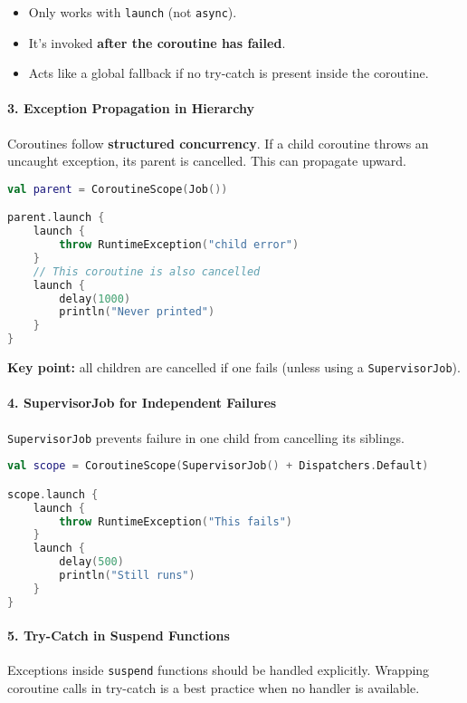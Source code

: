 \documentclass[a4paper,12pt]{article}
\begin{document}
\begin{itemize}
  \item Only works with \texttt{launch} (not \texttt{async}).
  \item It's invoked \textbf{after the coroutine has failed}.
  \item Acts like a global fallback if no try-catch is present inside the coroutine.
\end{itemize}

\paragraph{3. Exception Propagation in Hierarchy}
Coroutines follow \textbf{structured concurrency}. If a child coroutine throws an uncaught exception, its parent is cancelled. This can propagate upward.

\begin{lstlisting}[language=Kotlin]
val parent = CoroutineScope(Job())

parent.launch {
    launch {
        throw RuntimeException("child error")
    }
    // This coroutine is also cancelled
    launch {
        delay(1000)
        println("Never printed")
    }
}
\end{lstlisting}

\textbf{Key point:} all children are cancelled if one fails (unless using a \texttt{SupervisorJob}).

\paragraph{4. SupervisorJob for Independent Failures}
\texttt{SupervisorJob} prevents failure in one child from cancelling its siblings.

\begin{lstlisting}[language=Kotlin]
val scope = CoroutineScope(SupervisorJob() + Dispatchers.Default)

scope.launch {
    launch {
        throw RuntimeException("This fails")
    }
    launch {
        delay(500)
        println("Still runs")
    }
}
\end{lstlisting}

\paragraph{5. Try-Catch in Suspend Functions}
Exceptions inside \texttt{suspend} functions should be handled explicitly. Wrapping coroutine calls in try-catch is a best practice when no handler is available.
\end{document}
